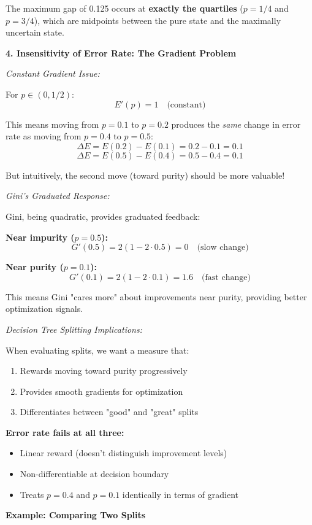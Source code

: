 \documentclass[12pt]{article}
\begin{document}
\begin{explanation}
The maximum gap of 0.125 occurs at \textbf{exactly the quartiles} ($p = 1/4$ and $p = 3/4$), which are midpoints between the pure state and the maximally uncertain state.

\textbf{4. Insensitivity of Error Rate: The Gradient Problem}

\textit{Constant Gradient Issue:}

For $p \in (0, 1/2)$:
\[
E'(p) = 1 \quad \text{(constant)}
\]

This means moving from $p=0.1$ to $p=0.2$ produces the \textit{same} change in error rate as moving from $p=0.4$ to $p=0.5$:
\[
\Delta E = E(0.2) - E(0.1) = 0.2 - 0.1 = 0.1
\]
\[
\Delta E = E(0.5) - E(0.4) = 0.5 - 0.4 = 0.1
\]

But intuitively, the second move (toward purity) should be more valuable!

\textit{Gini's Graduated Response:}

Gini, being quadratic, provides graduated feedback:

\textbf{Near impurity ($p=0.5$):}
\[
G'(0.5) = 2(1 - 2 \cdot 0.5) = 0 \quad \text{(slow change)}
\]

\textbf{Near purity ($p=0.1$):}
\[
G'(0.1) = 2(1 - 2 \cdot 0.1) = 1.6 \quad \text{(fast change)}
\]

This means Gini "cares more" about improvements near purity, providing better optimization signals.

\textit{Decision Tree Splitting Implications:}

When evaluating splits, we want a measure that:
\begin{enumerate}
    \item Rewards moving toward purity progressively
    \item Provides smooth gradients for optimization
    \item Differentiates between "good" and "great" splits
\end{enumerate}

\textbf{Error rate fails at all three:}
\begin{itemize}
    \item Linear reward (doesn't distinguish improvement levels)
    \item Non-differentiable at decision boundary
    \item Treats $p=0.4$ and $p=0.1$ identically in terms of gradient
\end{itemize}

\textbf{Example: Comparing Two Splits}


\end{explanation}
\end{document}
